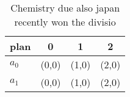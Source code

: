 \documentclass[a4paper]{article}
\begin{document}
\begin{table}
\begin{adjustbox}{width=0.6\columnwidth}
\begin{tabular}{|l|l|l|l|}
\hline
\textbf{plan} & \multicolumn{1}{c|}{\textbf{0}} & \multicolumn{1}{c|}{\textbf{1}} & \multicolumn{1}{c|}{\textbf{2}} \\ \hline
\textbf{$a_0$}  & (0,0) & (1,0) & (2,0) \\ \hline
\textbf{$a_1$}  & (0,0) & (1,0) & (2,0) \\ \hline
\end{tabular}
\end{adjustbox}
\caption{Chemistry due also japan recently won the divisio
}
\end{table}
\end{document}
